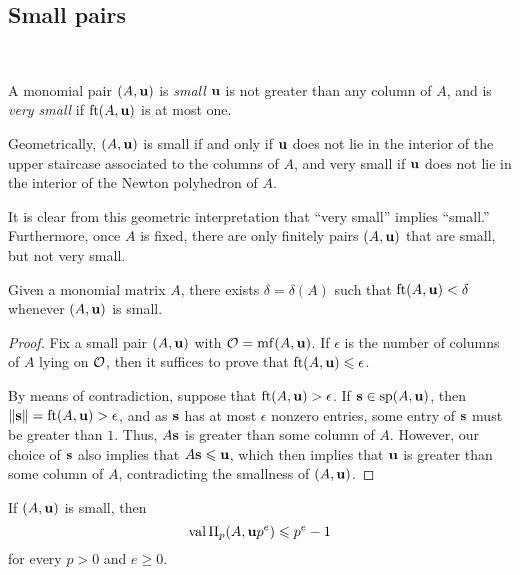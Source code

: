 \documentclass[11pt]{amsart}
\begin{document}
\subsection{Small pairs}

\ 

\begin{definition}
A monomial pair $(A, \mathbf{u})$ is \emph{small} $\mathbf{u}$ is not greater than any column of $A$, and is \emph{very small} if $\operatorname{ft}(A, \mathbf{u})$ is at most one.
\end{definition}

\begin{remark}
\label{finitely many small but not very small: R}
Geometrically, $(A, \mathbf{u})$ is small if and only if $\mathbf{u}$ does not lie in the interior of the upper staircase associated to the columns of $A$, and very small if $\mathbf{u}$ does not lie in the interior of the Newton polyhedron of $A$.  

It is clear from this geometric interpretation that ``very small'' implies ``small.''  Furthermore, once $A$ is fixed, there are only finitely pairs $(A, \mathbf{u})$ that are small, but not very small. 
\end{remark}

\begin{lemma}
\label{refined-discreteness: L}
Given a monomial matrix $A$, there exists $\delta = \delta(A)$ such that $\operatorname{ft}(A, \mathbf{u}) < \delta$ whenever $(A, \mathbf{u})$ is small.
\end{lemma}

\begin{proof}   Fix a small pair $(A, \mathbf{u})$ with $\mathcal{O} = \operatorname{mf}(A, \mathbf{u})$.  If $\epsilon$ is the number of columns of $A$ lying on $\mathcal{O}$, then it suffices to prove that $\operatorname{ft}(A, \mathbf{u}) \leqslant \epsilon$.

By means of contradiction, suppose that $\operatorname{ft}(A, \mathbf{u}) > \epsilon$.  If $\mathbf{s} \in \operatorname{sp}(A,\mathbf{u})$, then $\| \mathbf{s} \| = \operatorname{ft}(A, \mathbf{u}) > \epsilon$, and as $\mathbf{s}$ has at most $\epsilon$ nonzero entries, some entry of $\mathbf{s}$ must be greater than $1$.  Thus, $A \mathbf{s}$ is greater than some column of $A$.  However, our choice of $\mathbf{s}$ also implies that $A \mathbf{s} \leqslant \mathbf{u}$, which then implies that $\mathbf{u}$ is greater than some column of $A$, contradicting the smallness of $(A, \mathbf{u})$.
\end{proof}

\begin{lemma}
\label{trivial value bound: L}
If $(A, \mathbf{u})$ is small, then 
 \[ \operatorname{val} \Pi_p(A, \mathbf{u}p^e) \leqslant p^{e} -1 \] for every $p > 0$ and $e \geq 0$.
\end{lemma}
\end{document}
